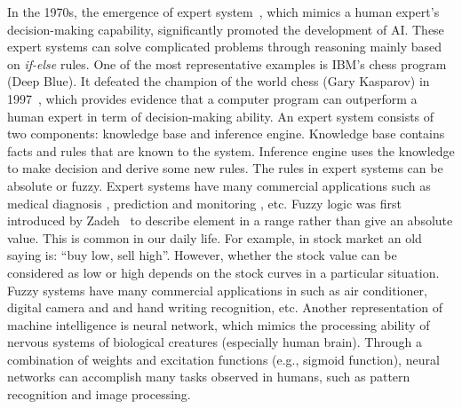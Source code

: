 In the 1970s, the emergence of expert system~\cite{Jackson1998}, which mimics a human expert's decision-making capability, significantly promoted the development of AI. These expert systems can solve complicated problems through reasoning mainly based on \textit{if-else} rules. One of the most representative examples is IBM's chess program (Deep Blue). It defeated the champion of the world chess (Gary Kasparov) in 1997~\cite{Newborn1992}, which provides evidence that a computer program can outperform a human expert in term of decision-making ability. An expert system consists of two components: knowledge base and inference engine. Knowledge base contains facts and rules that are known to the system. Inference engine uses the knowledge to make decision and derive some new rules. The rules in expert systems can be absolute or fuzzy. Expert systems have many commercial applications such as medical diagnosis \cite{Buchanan:1984}, prediction \cite{Robert1993} and monitoring \cite{Salvaneschi1996}, etc. Fuzzy logic was first introduced by Zadeh~\cite{Zadeh:IC:1965} to describe element in a range rather than give an absolute value. This is common in our daily life. For example, in stock market an old saying is: ``buy low, sell high''. However, whether the stock value can be considered as low or high depends on the stock curves in a particular situation. Fuzzy systems have many commercial applications in such as air conditioner, digital camera and and hand writing recognition, etc. Another representation of machine intelligence is neural network, which mimics the processing ability of nervous systems of biological creatures (especially human brain). Through a combination of weights and excitation functions (e.g., sigmoid function), neural networks can accomplish many tasks observed in humans, such as pattern recognition and image processing. 


